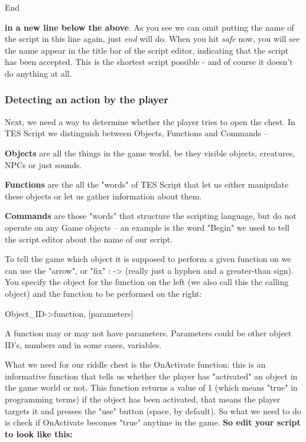 \documentclass[
]{article}
\begin{document}
End

\textbf{in a new line below the above}. As you see we can omit putting
the name of the script in this line again, just \emph{end} will do. When
you hit \emph{safe} now, you will see the name appear in the title bar
of the script editor, indicating that the script has been accepted. This
is the shortest script possible - and of course it doesn't do anything
at all.

\hypertarget{detecting-an-action-by-the-player}{%
\subsubsection{Detecting an action by the
player}\label{detecting-an-action-by-the-player}}

Next, we need a way to determine whether the player tries to open the
chest. In TES Script we distinguish between Objects, Functions and
Commands --

\textbf{Objects} are all the things in the game world, be they visible
objects, creatures, NPCs or just sounds.

\textbf{Functions} are the all the "words" of TES Script that let us
either manipulate these objects or let us gather information about them.

\textbf{Commands} are those "words" that structure the scripting
language, but do not operate on any Game objects -- an example is the
word "Begin" we used to tell the script editor about the name of our
script.

To tell the game which object it is supposed to perform a given function
on we can use the "arrow", or "fix" : -\textgreater{} (really just a
hyphen and a greater-than sign). You specify the object for the function
on the left (we also call this the calling object) and the function to
be performed on the right:

Object\_ID-\textgreater function, {[}parameters{]}

A function may or may not have parameters. Parameters could be other
object ID's, numbers and in some cases, variables.

What we need for our riddle chest is the OnActivate function: this is an
informative function that tells us whether the player has "activated" an
object in the game world or not. This function returns a value of 1
(which means "true" in programming terms) if the object has been
activated, that means the player targets it and presses the "use" button
(space, by default). So what we need to do is check if OnActivate
becomes "true" anytime in the game. \textbf{So edit your script to look
like this:}
\end{document}
